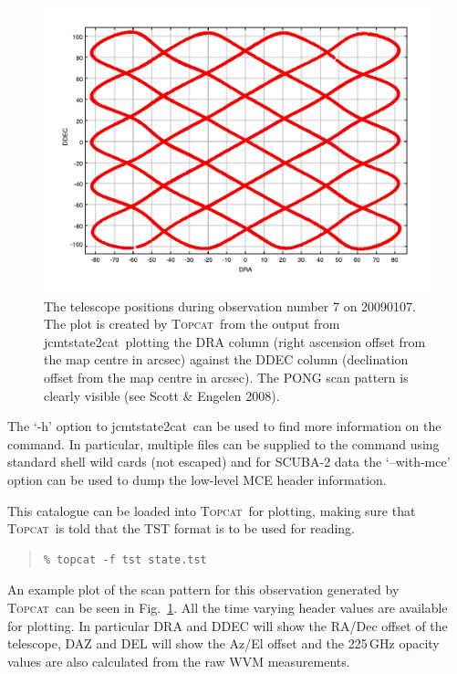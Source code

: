 \documentclass[twoside,11pt]{article}
\newcommand{\htmladdnormallink}[2]{#1}
\newcommand{\xref}[3]{#1}
\renewcommand{\_}{\texttt{\symbol{95}}}
\newenvironment{myquote}{\begin{quote}\begin{small}}{\end{small}\end{quote}}
\newcommand{\topcat}{\htmladdnormallink{\textsc{Topcat}}{http://www.starlink.ac.uk/topcat}}
\newcommand{\task}[1]{\textsf{#1}}
\newcommand{\jcmtstate}{\xref{\task{jcmtstate2cat}}{sun258}{JCMTSTATE2CAT}}
\begin{document}
\begin{figure}
\begin{center}
\includegraphics{sc19_scan_pattern}
\caption{The telescope positions during observation number 7 on
  20090107. The plot is created by \topcat\ from the output from
  \jcmtstate\ plotting the DRA column (right ascension offset from the
  map centre in arcsec) against the DDEC column (declination offset
  from the map centre in arcsec). The PONG scan pattern is clearly
  visible (see Scott \& Engelen 2008\cite{sc2ana005}).}
\label{fig:topcat}
\end{center}
\end{figure}

The `-h' option to \jcmtstate\ can be used to find more information on
the command. In particular, multiple files can be supplied to the
command using standard shell wild cards (not escaped) and for SCUBA-2
data the `--with-mce' option can be used to dump the low-level MCE
header information.

This catalogue can be loaded into \topcat\ for plotting, making sure
that \topcat\ is told that the TST format is to be used for reading.

\begin{myquote}
\begin{verbatim}
% topcat -f tst state.tst
\end{verbatim}
\end{myquote}

An example plot of the scan pattern for this observation generated by
\topcat\ can be seen in Fig.~\ref{fig:topcat}. All the time varying
header values are available for plotting. In particular DRA and DDEC
will show the RA/Dec offset of the telescope, DAZ and DEL will show
the Az/El offset and the 225\,GHz opacity values are also calculated
from the raw WVM measurements.
\end{document}
